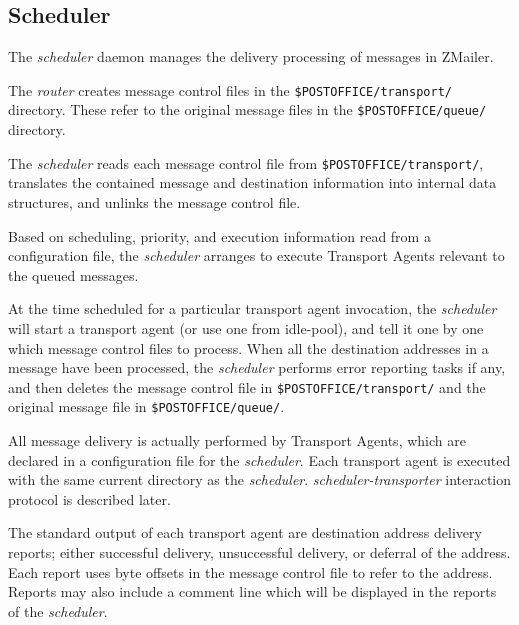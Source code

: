 \subsection{Scheduler}

The {\em scheduler\/} daemon manages the delivery processing of 
messages in ZMailer.

The {\em router\/} creates message control files in the
{\tt \$POSTOFFICE/transport/} directory. These refer to 
the original message files in the {\tt \$POSTOFFICE/queue/} 
directory.

The {\em scheduler\/} reads each message control file from
{\tt \$POSTOFFICE/transport/}, translates the contained 
message and destination information into internal data structures, 
and unlinks the message control file.

Based on scheduling, priority, and execution information read from a
configuration file, the {\em scheduler\/} arranges to execute 
Transport Agents relevant to the queued messages.

At the time scheduled for a particular transport agent invocation, the
{\em scheduler\/} will start a transport agent (or use one from idle-pool),
and tell it one by one which message control files to process.
When all the destination addresses in a message have been processed, the
{\em scheduler\/} performs error reporting tasks if any, and then deletes the
message control file in {\tt \$POSTOFFICE/transport/} and 
the original message file in {\tt \$POSTOFFICE/queue/}.

All message delivery is actually performed by Transport Agents, which
are declared in a configuration file for the {\em scheduler\/}.
Each transport agent is executed with the same current directory as the
{\em scheduler\/}. {\em scheduler-transporter\/} interaction protocol is
described later.

The standard output of each transport agent are destination address
delivery reports; either successful delivery, unsuccessful delivery, or
deferral of the address. Each report uses byte offsets in the message
control file to refer to the address. Reports may also include a comment
line which will be displayed in the reports of the {\em scheduler\/}.


